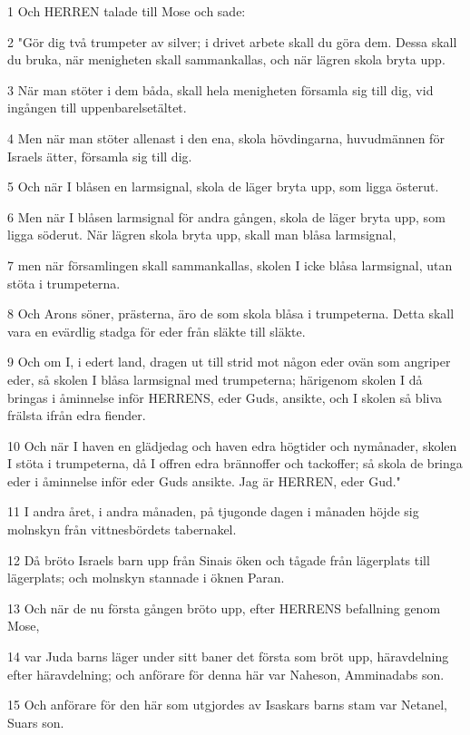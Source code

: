 \par 1 Och HERREN talade till Mose och sade:
\par 2 "Gör dig två trumpeter av silver; i drivet arbete skall du göra dem. Dessa skall du bruka, när menigheten skall sammankallas, och när lägren skola bryta upp.
\par 3 När man stöter i dem båda, skall hela menigheten församla sig till dig, vid ingången till uppenbarelsetältet.
\par 4 Men när man stöter allenast i den ena, skola hövdingarna, huvudmännen för Israels ätter, församla sig till dig.
\par 5 Och när I blåsen en larmsignal, skola de läger bryta upp, som ligga österut.
\par 6 Men när I blåsen larmsignal för andra gången, skola de läger bryta upp, som ligga söderut. När lägren skola bryta upp, skall man blåsa larmsignal,
\par 7 men när församlingen skall sammankallas, skolen I icke blåsa larmsignal, utan stöta i trumpeterna.
\par 8 Och Arons söner, prästerna, äro de som skola blåsa i trumpeterna. Detta skall vara en evärdlig stadga för eder från släkte till släkte.
\par 9 Och om I, i edert land, dragen ut till strid mot någon eder ovän som angriper eder, så skolen I blåsa larmsignal med trumpeterna; härigenom skolen I då bringas i åminnelse inför HERRENS, eder Guds, ansikte, och I skolen så bliva frälsta ifrån edra fiender.
\par 10 Och när I haven en glädjedag och haven edra högtider och nymånader, skolen I stöta i trumpeterna, då I offren edra brännoffer och tackoffer; så skola de bringa eder i åminnelse inför eder Guds ansikte. Jag är HERREN, eder Gud."
\par 11 I andra året, i andra månaden, på tjugonde dagen i månaden höjde sig molnskyn från vittnesbördets tabernakel.
\par 12 Då bröto Israels barn upp från Sinais öken och tågade från lägerplats till lägerplats; och molnskyn stannade i öknen Paran.
\par 13 Och när de nu första gången bröto upp, efter HERRENS befallning genom Mose,
\par 14 var Juda barns läger under sitt baner det första som bröt upp, häravdelning efter häravdelning; och anförare för denna här var Naheson, Amminadabs son.
\par 15 Och anförare för den här som utgjordes av Isaskars barns stam var Netanel, Suars son.
